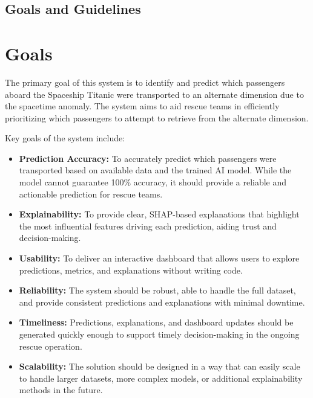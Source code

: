 \documentclass[15pt]{article}
\begin{document}
\subsection{Goals and Guidelines}
\section{Goals}

The primary goal of this system is to identify and predict which passengers aboard the Spaceship Titanic were transported to an alternate dimension due to the spacetime anomaly. The system aims to aid rescue teams in efficiently prioritizing which passengers to attempt to retrieve from the alternate dimension.

Key goals of the system include:

\begin{itemize}
    \item \textbf{Prediction Accuracy:} To accurately predict which passengers were transported based on available data and the trained AI model. While the model cannot guarantee 100\% accuracy, it should provide a reliable and actionable prediction for rescue teams.
    
    \item \textbf{Explainability:} To provide clear, SHAP-based explanations that highlight the most influential features driving each prediction, aiding trust and decision-making.
    
    \item \textbf{Usability:} To deliver an interactive dashboard that allows users to explore predictions, metrics, and explanations without writing code.
    
    \item \textbf{Reliability:} The system should be robust, able to handle the full dataset, and provide consistent predictions and explanations with minimal downtime.
    
    \item \textbf{Timeliness:} Predictions, explanations, and dashboard updates should be generated quickly enough to support timely decision-making in the ongoing rescue operation.
    
    \item \textbf{Scalability:} The solution should be designed in a way that can easily scale to handle larger datasets, more complex models, or additional explainability methods in the future.
\end{itemize}
\end{document}
